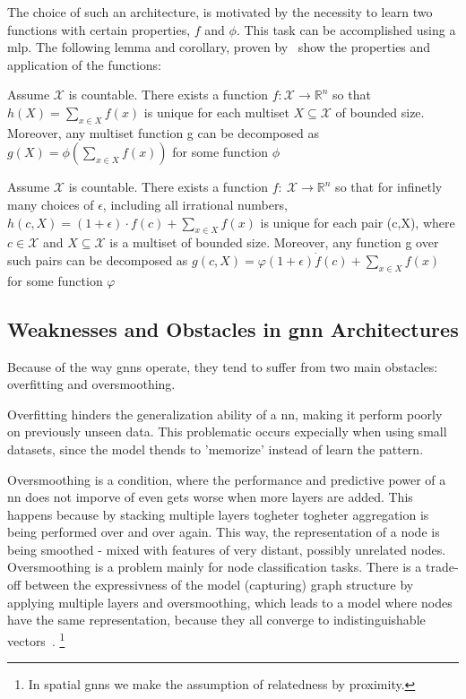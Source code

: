 The choice of such an architecture, is motivated by the necessity to learn two functions with certain properties,
$f$ and $\phi$. This task can be accomplished using a \ac{mlp}.
The following lemma and corollary, proven by~\citet{Xu2019} show the properties and application of the functions:

\begin{lem}
    Assume $\mathcal{X}$ is countable. There exists a function $f:\mathcal{X} \rightarrow \mathbb{R}^n$
    so that $h(X) = \sum_{x \in X}f(x)$ is unique for each multiset $X \subseteq \mathcal{X}$ of
    bounded size. Moreover, any multiset function g can be decomposed as $g(X) = \phi(\sum_{x \in X}f(x))$
    for some function $\phi$
\end{lem}

\begin{cor}
    Assume $\mathcal{X}$ is countable. There exists a function $f:\ \mathcal{X} \rightarrow \mathbb{R}^n$
    so that for infinetly many choices of $\epsilon$, including all irrational numbers, $h(c,X) = (1+ \epsilon)\cdot f(c) + \sum_{x \in X}f(x)$
    is unique for each pair (c,X), where $c \in \mathcal{X}$ and $X \subseteq \mathcal{X}$ is a multiset of bounded
    size. Moreover, any function g over such pairs can be decomposed as $g(c,X) = \varphi(1+\epsilon)\dot f(c) +\sum_{x \in X}f(x)$
    for some function $\varphi$
\end{cor}

\subsection{Weaknesses and Obstacles in \ac{gnn} Architectures}
\label{sec:related:pred:typical}
Because of the way \acp{gnn} operate, they tend to suffer from two main obstacles:
overfitting and oversmoothing.

Overfitting hinders the generalization ability of a \acf{nn}, making it perform poorly
on previously unseen data. This problematic occurs expecially when using small datasets,
since the model thends to 'memorize' instead of learn the pattern.

Oversmoothing is a condition, where the performance and predictive power of a \ac{nn}
does not imporve of even gets worse when more layers are added. This happens because
by stacking multiple layers  togheter togheter aggregation is being performed over and over again.
This way, the representation of a node is being smoothed - mixed with features of
very distant, possibly unrelated nodes. Oversmoothing is a problem mainly for node classification tasks. There is a trade-off between the expressivness of the model (capturing) graph structure by applying multiple layers and oversmoothing, which leads
to a model where nodes have the same representation,
because they all converge to indistinguishable vectors~\cite{Zhou2020,Hasanzadeh2020}.%
\footnote{In spatial \acp{gnn} we make the assumption of relatedness by proximity.}

